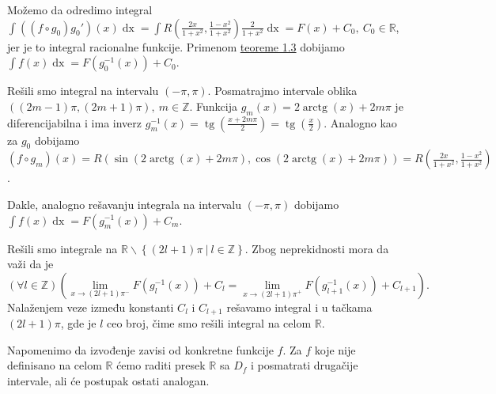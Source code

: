 \documentclass{article}
\DeclareMathOperator{\tg}{tg}
\DeclareMathOperator{\arctg}{arctg}
\DeclareMathOperator{\dx}{dx}
\begin{document}
Možemo da odredimo integral $\displaystyle\int\left(\left(f\circ g_0\right)g_0'\right)\left(x\right)\dx=\int R\left(\frac{2x}{1+x^2},\frac{1-x^2}{1+x^2}\right)\frac{2}{1+x^2}\dx=F\left(x\right)+C_0,\ C_0\in\mathbb{R}$,
jer je to integral racionalne funkcije. Primenom \hyperref[teorema_1.3]{teoreme 1.3} dobijamo
$\displaystyle\int f\left(x\right)\dx=F\left(g_0^{-1}\left(x\right)\right)+C_0$.\par
Rešili smo integral na intervalu $\left(-\pi,\pi\right)$. Posmatrajmo intervale
oblika $\left(\left(2m-1\right)\pi,\left(2m+1\right)\pi\right),\ m\in\mathbb{Z}$. Funkcija $g_m\left(x\right)=2\arctg\left(x\right)+2m\pi$
je diferencijabilna i ima inverz $g_m^{-1}\left(x\right)=\tg\left(\frac{x+2m\pi}{2}\right)=\tg\left(\frac{x}{2}\right)$. Analogno kao za
$g_0$ dobijamo $\left(f\circ g_m\right)\left(x\right)=R\left(\sin\left(2\arctg\left(x\right)+2m\pi\right),\cos\left(2\arctg\left(x\right)+2m\pi\right)\right)=R\left(\frac{2x}{1+x^2},\frac{1-x^2}{1+x^2}\right)$.\par
Dakle, analogno rešavanju integrala na intervalu $\left(-\pi,\pi\right)$ dobijamo  $\displaystyle\int f\left(x\right)\dx=F\left(g_m^{-1}\left(x\right)\right)+C_m$.\par
Rešili smo integrale na $\mathbb{R}\backslash\left\{\left(2l+1\right)\pi\ |\ l\in\mathbb{Z}\right\}$. Zbog neprekidnosti mora da važi da
je $$\left(\forall l\in\mathbb{Z}\right)\left(\lim\limits_{x\to \left(2l+1\right)\pi^{-}}F\left(g_l^{-1}\left(x\right)\right)+C_{l}=\lim\limits_{x\to \left(2l+1\right)\pi^{+}}F\left(g_{l+1}^{-1}\left(x\right)\right)+C_{l+1}\right).$$
Nalaženjem veze između konstanti $C_l$ i $C_{l+1}$ rešavamo integral i u tačkama $\left(2l+1\right)\pi$, gde je $l$ ceo broj, čime smo rešili integral
na celom $\mathbb{R}$.\par
Napomenimo da izvođenje zavisi od konkretne funkcije $f$. Za $f$ koje nije definisano na celom $\mathbb{R}$ ćemo raditi presek $\mathbb{R}$ sa $D_f$ i
posmatrati drugačije intervale, ali će postupak ostati analogan.
\end{document}
